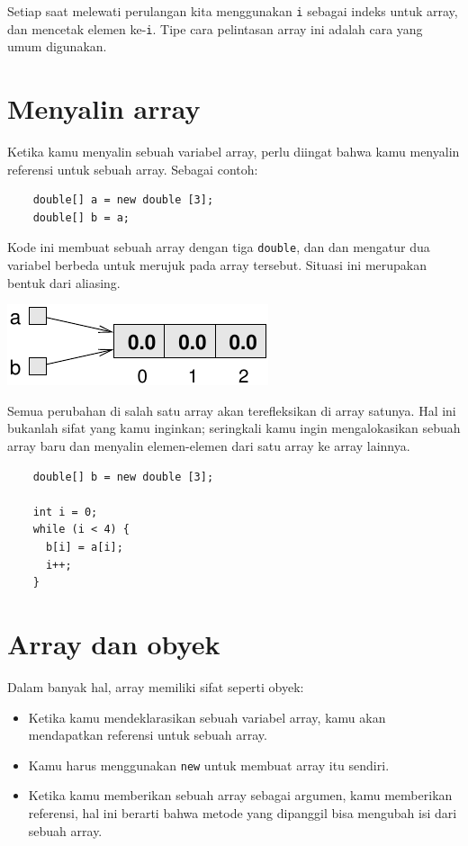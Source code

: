 Setiap saat melewati perulangan kita menggunakan {\tt i} sebagai indeks untuk array, dan mencetak elemen ke-{\tt i}.  Tipe cara pelintasan array ini adalah cara yang umum digunakan.


\section{Menyalin array}

Ketika kamu menyalin sebuah variabel array, perlu diingat bahwa kamu menyalin referensi untuk sebuah array. Sebagai contoh:

\begin{lstlisting}
    double[] a = new double [3];
    double[] b = a;
\end{lstlisting}
%
Kode ini membuat sebuah array dengan tiga {\tt double}, dan
dan mengatur dua variabel berbeda untuk merujuk pada array tersebut.
Situasi ini merupakan bentuk dari aliasing.


\includegraphics{array3.pdf}


Semua perubahan di salah satu array akan terefleksikan di array satunya. Hal ini bukanlah sifat yang kamu inginkan; seringkali kamu ingin mengalokasikan sebuah array baru dan menyalin elemen-elemen dari satu array ke array lainnya.

\begin{lstlisting}
    double[] b = new double [3];

    int i = 0;
    while (i < 4) {
      b[i] = a[i];
      i++;
    }
\end{lstlisting}


\section{Array dan obyek}

Dalam banyak hal, array memiliki sifat seperti obyek:

\begin{itemize}

\item Ketika kamu mendeklarasikan sebuah variabel array, kamu akan mendapatkan referensi untuk sebuah array.

\item Kamu harus menggunakan {\tt new} untuk membuat array itu sendiri.

\item Ketika kamu memberikan sebuah array sebagai argumen, kamu memberikan referensi, hal ini berarti bahwa metode yang dipanggil bisa mengubah isi dari sebuah array.

\end{itemize}


